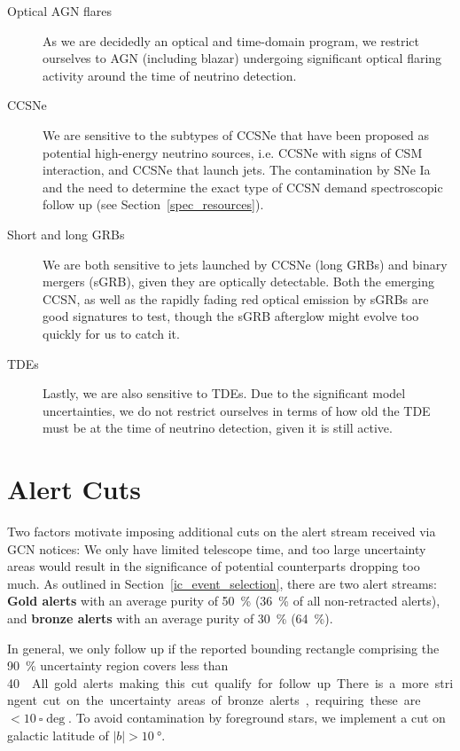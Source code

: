 \begin{description}
    \item[Optical AGN flares] As we are decidedly an optical and time-domain program, we restrict ourselves to AGN (including blazar) undergoing significant optical flaring activity around the time of neutrino detection.
    \item[CCSNe] We are sensitive to the subtypes of CCSNe that have been proposed as potential high-energy neutrino sources, i.e. CCSNe with signs of CSM interaction, and CCSNe that launch jets. The contamination by SNe Ia and the need to determine the exact type of CCSN demand spectroscopic follow up (see Section~\ref{spec_resources}).
    \item[Short and long GRBs] We are both sensitive to jets launched by CCSNe (long GRBs) and binary mergers (sGRB), given they are optically detectable. Both the emerging CCSN, as well as the rapidly fading red optical emission by sGRBs are good signatures to test, though the sGRB afterglow might evolve too quickly for us to catch it.
    \item[TDEs] Lastly, we are also sensitive to TDEs. Due to the significant model uncertainties, we do not restrict ourselves in terms of how old the TDE must be at the time of neutrino detection, given it is still active.
\end{description}


\section{Alert Cuts}\label{alert_cuts}
Two factors motivate imposing additional cuts on the alert stream received via GCN notices: We only have limited telescope time, and too large uncertainty areas would result in the significance of potential counterparts dropping too much. As outlined in Section~\ref{ic_event_selection}, there are two alert streams: \textbf{Gold alerts} with an average purity of \SI{50}{\percent} (\SI{36}{\percent} of all non-retracted alerts), and \textbf{bronze alerts} with an average purity of \SI{30}{\percent} (\SI{64}{\percent}).

In general, we only follow up if the reported bounding rectangle comprising the \SI{90}{\percent} uncertainty region covers less than \SI{40}{\square\deg}. All gold alerts making this cut qualify for follow up. There is a more stringent cut on the uncertainty areas of bronze alerts, requiring these are $<\SI{10}{\square\deg}$. To avoid contamination by foreground stars, we implement a cut on galactic latitude of $|b|>\SI{10}{\degree}$.

